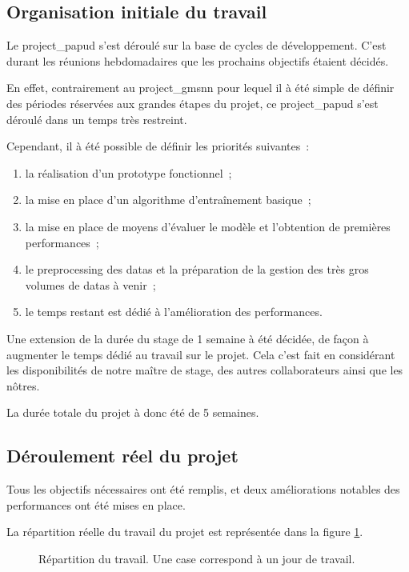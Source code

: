 \subsection{Organisation initiale du travail}
Le \gls{project_papud} s'est déroulé sur la base de cycles de développement.
C'est durant les réunions hebdomadaires que les prochains objectifs étaient décidés.

En effet, contrairement au \gls{project_gmsnn} pour lequel il à été simple de définir des périodes réservées aux grandes étapes du projet, ce \gls{project_papud} s'est déroulé dans un temps très restreint.

\pagebreak
Cependant, il à été possible de définir les priorités suivantes~:
\begin{enumerate}
	\item la réalisation d'un prototype fonctionnel~;
	\item la mise en place d'un algorithme d'entraînement basique~;
	\item la mise en place de moyens d'évaluer le modèle et l'obtention de premières performances~;
	\item le \gls{preprocessing} des \glspl{data} et la préparation de la gestion des très gros volumes de \glspl{data} à venir~;
	\item le temps restant est dédié à l'amélioration des performances.
\end{enumerate}
\hspace{1em}

Une extension de la durée du stage de 1 semaine à été décidée, de façon à augmenter le temps dédié au travail sur le projet.
Cela c'est fait en considérant les disponibilités de notre maître de stage, des autres collaborateurs ainsi que les nôtres.

La durée totale du projet à donc été de 5 semaines.

\subsection{Déroulement réel du projet}
Tous les objectifs nécessaires ont été remplis, et deux améliorations notables des performances ont été mises en place.

La répartition réelle du travail du projet est représentée dans la figure \ref{fig:papud_time}.

\begin{figure}[ht]
	\centering
	\caption[Répartition du travail]{Répartition du travail. Une case correspond à un jour de travail.}\label{fig:papud_time}
\end{figure}

